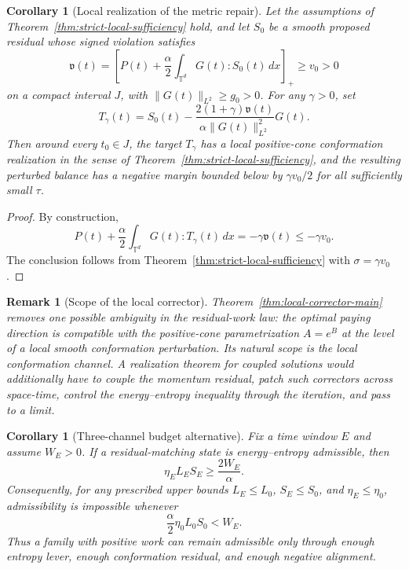 \documentclass[11pt]{article}
\numberwithin{equation}{section}
\newtheorem{corollary}[theorem]{Corollary}
\newtheorem{remark}[theorem]{Remark}
\newcommand{\T}{\mathbb T}
\begin{document}
\begin{corollary}[Local realization of the metric repair]
\label{cor:local-metric-repair}
Let the assumptions of Theorem~\ref{thm:strict-local-sufficiency} hold, and let
\(S_0\) be a smooth proposed residual whose signed violation satisfies
\[
  \mathfrak v(t)
  =
  \left[P(t)+\frac{\alpha}{2}\int_{\T^d}G(t):S_0(t)\,dx\right]_+
  \ge v_0>0
\]
on a compact interval \(J\), with \(\|G(t)\|_{L^2}\ge g_0>0\).  For any
\(\gamma>0\), set
\[
  T_\gamma(t)
  =
  S_0(t)-\frac{2(1+\gamma)\mathfrak v(t)}
  {\alpha\|G(t)\|_{L^2}^2}G(t).
\]
Then around every \(t_0\in J\), the target \(T_\gamma\) has a local
positive-cone conformation realization in the sense of
Theorem~\ref{thm:strict-local-sufficiency}, and the resulting perturbed balance
has a negative margin bounded below by \(\gamma v_0/2\) for all sufficiently
small \(\tau\).
\end{corollary}

\begin{proof}
By construction,
\[
  P(t)+\frac{\alpha}{2}\int_{\T^d}G(t):T_\gamma(t)\,dx
  =
  -\gamma\mathfrak v(t)
  \le -\gamma v_0 .
\]
The conclusion follows from Theorem~\ref{thm:strict-local-sufficiency} with
\(\sigma=\gamma v_0\).
\end{proof}

\begin{remark}[Scope of the local corrector]
Theorem~\ref{thm:local-corrector-main} removes one possible ambiguity in the
residual-work law: the optimal paying direction is compatible with the
positive-cone parametrization $A=e^B$ at the level of a local smooth
conformation perturbation.  Its natural scope is the local conformation
channel.  A realization theorem for coupled solutions would additionally have
to couple the momentum residual, patch such correctors across space-time,
control the energy--entropy inequality through the iteration, and pass to a
limit.
\end{remark}

\begin{corollary}[Three-channel budget alternative]
\label{cor:three-channel}
Fix a time window \(E\) and assume \(W_E>0\).  If a residual-matching state is
energy--entropy admissible, then
\[
  \eta_E L_E S_E \ge \frac{2W_E}{\alpha}.
\]
Consequently, for any prescribed upper bounds
\(L_E\le L_0\), \(S_E\le S_0\), and \(\eta_E\le\eta_0\), admissibility is
impossible whenever
\[
  \frac{\alpha}{2}\eta_0 L_0S_0<W_E .
\]
Thus a family with positive work can remain admissible only through enough
entropy lever, enough conformation residual, and enough negative alignment.
\end{corollary}
\end{document}
